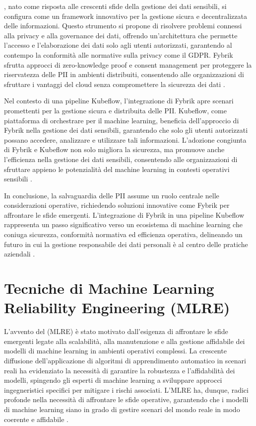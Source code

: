 , nato come risposta alle crescenti sfide della gestione dei dati sensibili, si configura come un framework innovativo per la gestione sicura e decentralizzata delle informazioni. Questo strumento si propone di risolvere problemi connessi alla privacy e alla governance dei dati, offrendo un'architettura che permette l'accesso e l'elaborazione dei dati solo agli utenti autorizzati, garantendo al contempo la conformità alle normative sulla privacy come il GDPR. Fybrik sfrutta approcci di zero-knowledge proof e consent management per proteggere la riservatezza delle PII in ambienti distribuiti, consentendo alle organizzazioni di sfruttare i vantaggi del cloud senza compromettere la sicurezza dei dati \cite{fybrik_origin}.

Nel contesto di una pipeline Kubeflow, l'integrazione di Fybrik apre scenari promettenti per la gestione sicura e distribuita delle PII. Kubeflow, come piattaforma di orchestrare per il machine learning, beneficia dell'approccio di Fybrik nella gestione dei dati sensibili, garantendo che solo gli utenti autorizzati possano accedere, analizzare e utilizzare tali informazioni. L'adozione congiunta di Fybrik e Kubeflow non solo migliora la sicurezza, ma promuove anche l'efficienza nella gestione dei dati sensibili, consentendo alle organizzazioni di sfruttare appieno le potenzialità del machine learning in contesti operativi sensibili \cite{kubeflow_fybrik_integration}.

In conclusione, la salvaguardia delle PII assume un ruolo centrale nelle considerazioni operative, richiedendo soluzioni innovative come Fybrik per affrontare le sfide emergenti. L'integrazione di Fybrik in una pipeline Kubeflow rappresenta un passo significativo verso un ecosistema di machine learning che coniuga sicurezza, conformità normativa ed efficienza operativa, delineando un futuro in cui la gestione responsabile dei dati personali è al centro delle pratiche aziendali \cite{pii_security_ml}.

\section{Tecniche di Machine Learning Reliability Engineering (MLRE)}

L'avvento del  (MLRE) è stato motivato dall'esigenza di affrontare le sfide emergenti legate alla scalabilità, alla manutenzione e alla gestione affidabile dei modelli di machine learning in ambienti operativi complessi. La crescente diffusione dell'applicazione di algoritmi di apprendimento automatico in scenari reali ha evidenziato la necessità di garantire la robustezza e l'affidabilità dei modelli, spingendo gli esperti di machine learning a sviluppare approcci ingegneristici specifici per mitigare i rischi associati. L'MLRE ha, dunque, radici profonde nella necessità di affrontare le sfide operative, garantendo che i modelli di machine learning siano in grado di gestire scenari del mondo reale in modo coerente e affidabile \cite{MLRE_origin}.

